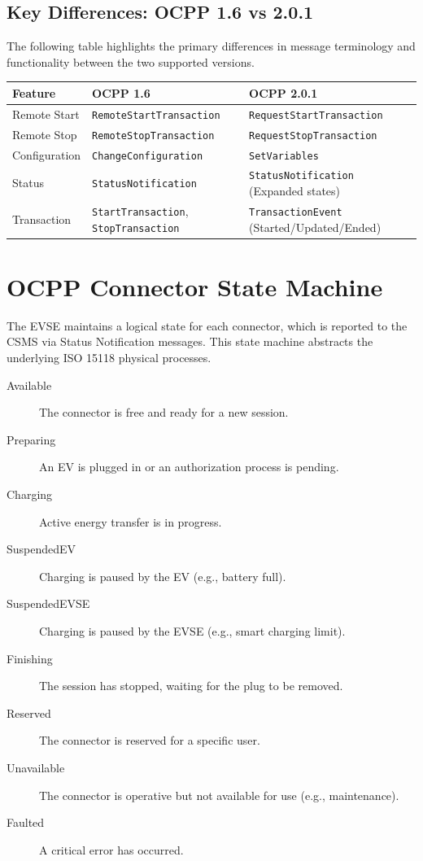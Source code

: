 \documentclass[a4paper,11pt]{report}
\begin{document}
\subsection{Key Differences: OCPP 1.6 vs 2.0.1}
The following table highlights the primary differences in message terminology and functionality between the two supported versions.

\begin{center}
\begin{tabular}{|l|l|l|}
\hline
\textbf{Feature} & \textbf{OCPP 1.6} & \textbf{OCPP 2.0.1} \\
\hline
\rowcolor{gray!10} Remote Start & \texttt{RemoteStartTransaction} & \texttt{RequestStartTransaction} \\
\hline
Remote Stop & \texttt{RemoteStopTransaction} & \texttt{RequestStopTransaction} \\
\hline
\rowcolor{gray!10} Configuration & \texttt{ChangeConfiguration} & \texttt{SetVariables} \\
\hline
Status & \texttt{StatusNotification} & \texttt{StatusNotification} (Expanded states) \\
\hline
\rowcolor{gray!10} Transaction & \texttt{StartTransaction}, \texttt{StopTransaction} & \texttt{TransactionEvent} (Started/Updated/Ended) \\
\hline
\end{tabular}
\end{center}





\section{OCPP Connector State Machine}
The EVSE maintains a logical state for each connector, which is reported to the CSMS via Status Notification messages. This state machine abstracts the underlying ISO 15118 physical processes.

\begin{description}
    \item[Available] The connector is free and ready for a new session.
    \item[Preparing] An EV is plugged in or an authorization process is pending.
    \item[Charging] Active energy transfer is in progress.
    \item[SuspendedEV] Charging is paused by the EV (e.g., battery full).
    \item[SuspendedEVSE] Charging is paused by the EVSE (e.g., smart charging limit).
    \item[Finishing] The session has stopped, waiting for the plug to be removed.
    \item[Reserved] The connector is reserved for a specific user.
    \item[Unavailable] The connector is operative but not available for use (e.g., maintenance).
    \item[Faulted] A critical error has occurred.
\end{description}
\end{document}
